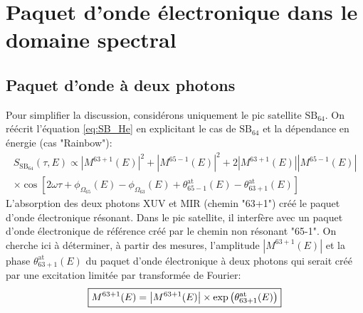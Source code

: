 \section{Paquet d'onde électronique dans le domaine spectral}
\subsection{Paquet d'onde à deux photons}
\label{subsec:POE_2phot_spec}
Pour simplifier la discussion, considérons uniquement le pic satellite $\text{SB}_{64}$. On réécrit l'équation \ref{eq:SB_He} en explicitant le cas de $\text{SB}_{64}$ et la dépendance en énergie (cas "Rainbow"):
\begin{multline}
S_{\text{SB}_{64}}(\tau,E) \propto \left| M^{63+1}(E)\right|^2 + \left| M^{65-1}(E)\right|^2 + 2 \left| M^{63+1}(E)\right| \left| M^{65-1}(E)\right| \\ \times \cos[2 \omega \tau + \phi_{\Omega_{65}}(E) - \phi_{\Omega_{63}}(E) + \theta^{\text{at}}_{65-1}(E) - \theta^{\text{at}}_{63+1}(E)]
\end{multline}
L'absorption des deux photons XUV et MIR (chemin "63+1") créé le paquet d'onde électronique résonant. Dans le pic satellite, il interfère avec un paquet d'onde électronique de référence créé par le chemin non résonant "65-1". On cherche ici à déterminer, à partir des mesures, l'amplitude $\left| M^{63+1}(E)\right|$ et la phase $\theta^{\text{at}}_{63+1}(E)$ du paquet d'onde électronique à deux photons qui serait créé par une excitation limitée par transformée de Fourier:
\begin{equation}
\setlength\fboxrule{0.5pt}
\boxed{
M^{63+1}(E) = \left| M^{63+1}(E)\right| \times \mathrm{exp} \left( \theta^{\text{at}}_{63+1}(E) \right)
}
\end{equation}

